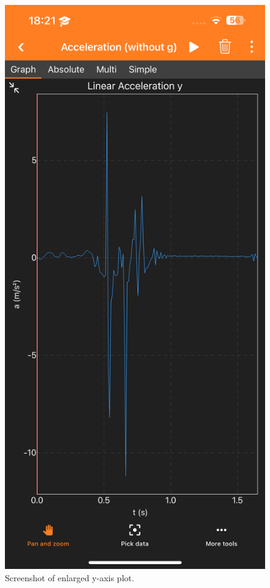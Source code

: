 \documentclass[idxtotoc,hyperref,openany]{labbook} %
\begin{document}
\begin{figure}[H] %
\begin{center}
\includegraphics[width=.7\linewidth]{images/Lab.02/PhoneDropY.PNG}
\end{center}
\caption{Screenshot of enlarged y-axis plot.}
\label{fig:Lab02-PhoneDropY}
\end{figure}
\end{document}
